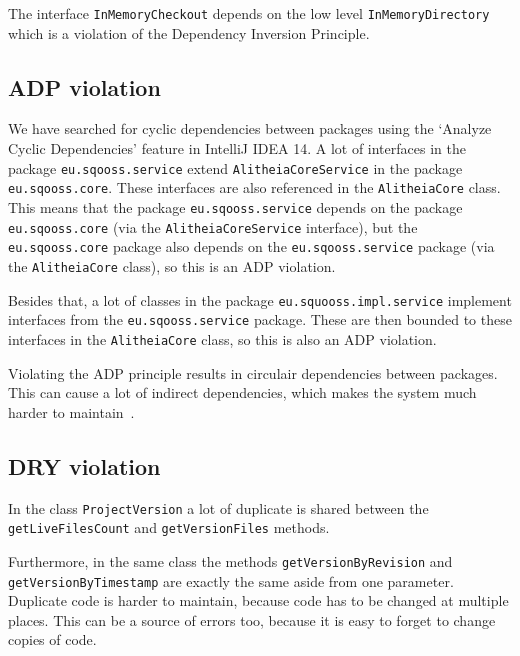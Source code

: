 \documentclass{article}
\begin{document}
The interface \verb|InMemoryCheckout| depends on the low level \verb|InMemoryDirectory| which is a violation of the Dependency Inversion Principle. %

\subsection{ADP violation}

We have searched for cyclic dependencies between packages using the `Analyze Cyclic Dependencies' feature in IntelliJ IDEA 14. A lot of interfaces in the package \verb|eu.sqooss.service| extend \verb|AlitheiaCoreService| in the package \verb|eu.sqooss.core|. These interfaces are also referenced in the \verb|AlitheiaCore| class. This means that the package \verb|eu.sqooss.service| depends on the package \verb|eu.sqooss.core| (via the \verb|AlitheiaCoreService| interface), but the \verb|eu.sqooss.core| package also depends on the \verb|eu.sqooss.service| package (via the \verb|AlitheiaCore| class), so this is an ADP violation.


Besides that, a lot of classes in the package \verb|eu.squooss.impl.service| implement interfaces from the \verb|eu.sqooss.service| package. These are then bounded to these interfaces in the \verb|AlitheiaCore| class, so this is also an ADP violation.

Violating the ADP principle results in circulair dependencies between packages. This can cause a lot of indirect dependencies, which makes the system much harder to maintain~\cite{stan4j}.

\subsection{DRY violation}
In the class \verb|ProjectVersion| a lot of duplicate is shared between the \verb|getLiveFilesCount| and \verb|getVersionFiles| methods. 

Furthermore, in the same class the methods \verb|getVersionByRevision| and \verb|getVersionByTimestamp| are exactly the same aside from one parameter.
Duplicate code is harder to maintain, because code has to be changed at multiple places. This can be a source of errors too, because it is easy to forget to change copies of code. 

\end{document}
